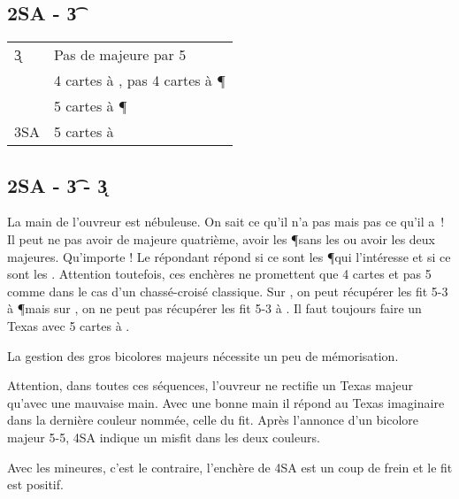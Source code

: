 \documentclass[a4paper,12pt]{article}
\begin{document}
\subsection*{2SA - \t3}



\begin{tabular}{ll}
 \k3  & Pas de majeure par 5 \\
 \co3 & 4 cartes à \C, pas 4 cartes à \P\\
 \p3  & 5 cartes à \P\\
 3SA & 5 cartes à \C\\
\end{tabular}

\subsection*{2SA - \t3 - \k3}
La main de l'ouvreur est nébuleuse. On sait ce qu'il n'a pas  mais pas ce qu'il a\ ! Il peut ne pas avoir de majeure quatrième, avoir les \P sans les \C ou avoir les deux majeures. Qu'importe ! Le répondant répond  si ce sont les \P qui l'intéresse et  si ce sont les \C.
Attention toutefois, ces enchères ne promettent que 4 cartes et pas 5 comme dans le cas d'un chassé-croisé classique. Sur , on peut récupérer les fit 5-3 à \P mais sur , on ne peut pas récupérer les fit 5-3 à \C. Il faut toujours faire un Texas avec 5 cartes à \C.

La gestion des gros bicolores majeurs nécessite un peu de mémorisation.

Attention, dans toutes ces séquences, l'ouvreur ne rectifie un Texas majeur qu'avec une mauvaise main. Avec une bonne main il répond au Texas imaginaire dans la dernière couleur nommée, celle du fit. Après l'annonce d'un bicolore majeur 5-5, 4SA indique un misfit dans les deux couleurs.

Avec les mineures, c'est le contraire, l'enchère de 4SA est un coup de frein et le fit est positif.
\end{document}
